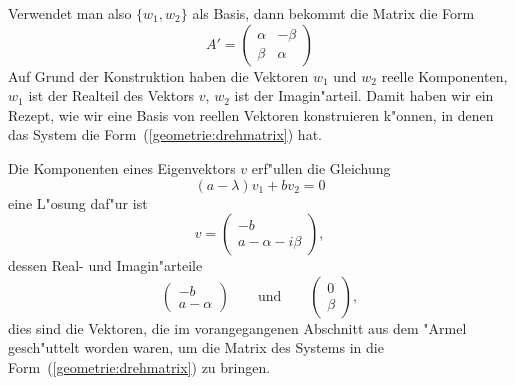 Verwendet man also $\{w_1,w_2\}$ als Basis, dann bekommt die Matrix die
Form
\begin{equation}
A'=\begin{pmatrix}
\alpha&-\beta\\
\beta &\alpha
\end{pmatrix}
\label{geometrie:drehmatrix}
\end{equation}
Auf Grund der Konstruktion haben die Vektoren $w_1$ und $w_2$ reelle
Komponenten, $w_1$ ist der Realteil des Vektors $v$, $w_2$ ist
der Imagin"arteil.
Damit haben wir ein Rezept, wie wir eine Basis von reellen Vektoren
konstruieren k"onnen, in denen das System die
Form~(\ref{geometrie:drehmatrix}) hat.

Die Komponenten eines Eigenvektors $v$ erf"ullen die Gleichung
\[
(a-\lambda)v_1 + bv_2=0
\]
eine L"osung daf"ur ist
\[
v=\begin{pmatrix}
-b\\
a-\alpha-i\beta
\end{pmatrix},
\]
dessen Real- und Imagin"arteile
\[
\begin{pmatrix}
-b\\a-\alpha
\end{pmatrix}
\qquad\text{und}\qquad
\begin{pmatrix}
0\\\beta
\end{pmatrix},
\]
dies sind die Vektoren, die im vorangegangenen Abschnitt aus dem "Armel
gesch"uttelt worden waren, um die Matrix des Systems in die
Form~(\ref{geometrie:drehmatrix}) zu bringen.

%
%
